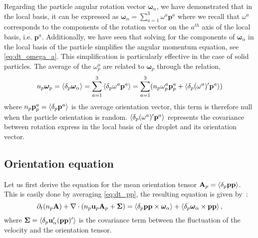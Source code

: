 Regarding the particle angular rotation vector $\bm\omega_\alpha$, we have demonstrated that in the local basis, it can be expressed as $\bm\omega_\alpha  =\sum_{a=1}^3 \omega^a \textbf{p}^a$ where we recall that $\omega^a$ corresponds to the components of the rotation vector on the $a^{th}$ axis of the local basis, i.e. $\textbf{p}^a$.
Additionally, we have seen that solving for the components of $\bm\omega_\alpha$ in the local basis of the particle simplifies the angular momentum equation, see \ref{eq:dt_omega_a}.  
This simplification is particularly effective in the case of solid particles. 
The average of the $\omega^a_p$ are related to $\bm\omega_p$ through the relation, 
\begin{equation}
    n_p \bm\omega_p
    = \pavg{\bm\omega_\alpha}
    =\sum_{a=1}^3\pavg{\omega^a \textbf{p}^a}
    =\sum_{a=1}^3(n_p \omega^a_p   \textbf{p}_p^a
    +\pavg{(\omega^a)' \textbf{p}^a})
    \label{eq:omega_p_local}
\end{equation}
where $n_p \textbf{p}_p^a = \left<\delta_p \textbf{p}^a\right>$ is the average orientation vector, this term is therefore null when the particle orientation is random.  
$\left<\delta_p (\omega^a)' \textbf{p}^a\right>$ represents the covariance between rotation express in the local basis of the droplet and its orientation vector. 


\subsection{Orientation equation}

Let us first derive the equation for the mean orientation tensor $\textbf{A}_p = \left<\delta_p \textbf{pp}\right>$. 
This is easily done by averaging \ref{eq:dt_pp}, the resulting equation is given by~:
\begin{equation}
    \pddt (n_p\textbf{A})
    + \div (
        n_p\textbf{u}_p\textbf{A}_p
        + \mathbf{\Sigma}
        )
    =
    \pavg{\textbf{pp} \times \bm\omega_\alpha}
    + \pavg{\bm\omega_\alpha \times \textbf{pp}},
    \label{eq:avg_dt_pp_alpha}
\end{equation}
where $\mathbf{\Sigma} = \left<\delta_p \textbf{u}'_\alpha(\textbf{pp})'\right>$ is the covariance term between the fluctuation of the velocity and the orientation tensor.

